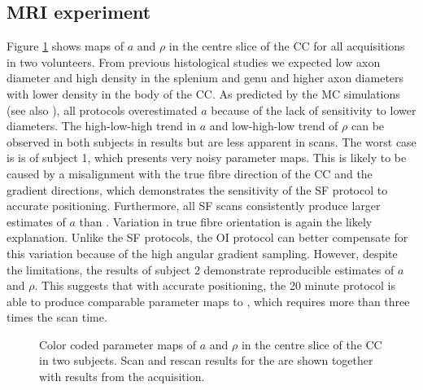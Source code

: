 \subsection*{MRI experiment}
Figure \ref{fig:experiment4:maps} shows maps of $a$ and $\rho$ in the centre slice of the \gls{CC} for all acquisitions in two volunteers. From previous histological studies \cite{Aboitiz:1992} we expected low axon diameter and high density in the splenium and genu and higher axon diameters with lower density in the body of the \gls{CC}. As predicted by the MC simulations (see also \citet{Alexander:2010}), all protocols overestimated $a$ because of the lack of sensitivity to lower diameters. The high-low-high trend in $a$ and low-high-low trend of $\rho$ can be observed in both subjects in \OIlong{} results but are less apparent in \SFshort{} scans. The worst case is is \SFshort{} of subject 1, which presents very noisy parameter maps. This is likely to be caused by a misalignment with the true fibre direction of the \gls{CC} and the gradient directions, which demonstrates the sensitivity of the SF protocol to accurate positioning. Furthermore, all SF scans consistently produce larger estimates of $a$ than \OIlong{}. Variation in true fibre orientation is again the likely explanation. Unlike the SF protocols, the OI protocol can better compensate for this variation because of the high angular gradient sampling. However, despite the limitations, the results of subject 2 demonstrate reproducible estimates of $a$ and $\rho$. This suggests that with accurate positioning, the 20 minute \SFshort{} protocol is able to produce comparable parameter maps to \OIlong, which requires more than three times the scan time.
\begin{figure}
 \centering
  \caption{Color coded parameter maps of $a$ and $\rho$ in the centre slice of the CC in two subjects. Scan and rescan results for the \SFshort{} are shown together with results from the \OIlong{} acquisition.}
  \label{fig:experiment4:maps}
\end{figure}
